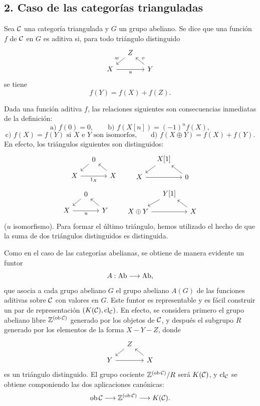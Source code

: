 \subsection*{2. Caso de las categorías trianguladas}

Sea $\mathcal C$ una categoría triangulada y $G$ un grupo abeliano. Se dice que una función $f$ de $\mathcal C$ en $G$ es aditiva si, para todo triángulo distinguido
\[
\begin{tikzcd}[column sep=small,row sep=small]
& Z \arrow[dl,"w"']\\
X \arrow[rr,"u"'] && Y \arrow[ul,"v"']
\end{tikzcd}
\]
se tiene
\[
f(Y)=f(X)+f(Z).
\]

Dada una función aditiva $f$, las relaciones siguientes son consecuencias inmediatas de la definición:
\[
\text{a) } f(0)=0,\qquad
\text{b) } f(X[n])=(-1)^n f(X),
\]
\[
\text{c) } f(X)=f(Y)\text{ si }X\text{ e }Y\text{ son isomorfos,}
\qquad
\text{d) } f(X\oplus Y)=f(X)+f(Y).
\]
En efecto, los triángulos siguientes son distinguidos:
\[
\begin{tikzcd}[column sep=small,row sep=small]
&0 \arrow[dl]\\ X \arrow[rr,"1_X"']&&X\arrow[ul]
\end{tikzcd}
\qquad
\begin{tikzcd}[column sep=small,row sep=small]
&X[1]\arrow[dl]\\ X\arrow[rr]&&0\arrow[ul]
\end{tikzcd}
\]
\[
\begin{tikzcd}[column sep=small,row sep=small]
&0\arrow[dl]\\ X\arrow[rr,"u"']&&Y\arrow[ul]
\end{tikzcd}
\qquad
\begin{tikzcd}[column sep=small,row sep=small]
&Y[1]\arrow[dl]\\ X\oplus Y\arrow[rr]&&X\arrow[ul]
\end{tikzcd}
\]
($u$ isomorfismo). Para formar el último triángulo, hemos utilizado el hecho de que la suma de dos triángulos distinguidos es distinguida.

Como en el caso de las categorías abelianas, se obtiene de manera evidente un funtor
\[
A:\operatorname{Ab}\longrightarrow\operatorname{Ab},
\]
que asocia a cada grupo abeliano $G$ el grupo abeliano $A(G)$ de las funciones aditivas sobre $\mathcal C$ con valores en $G$. Este funtor es representable y es fácil construir un par de representación $(K(\mathcal C),\operatorname{cl}_{\mathcal C})$. En efecto, se considera primero el grupo abeliano libre $\mathbb Z^{(\operatorname{ob}\mathcal C)}$ generado por los objetos de $\mathcal C$, y después el subgrupo $R$ generado por los elementos de la forma $X-Y-Z$, donde
\[
\begin{tikzcd}[column sep=small,row sep=small]
&Z\arrow[dl]\\ Y\arrow[rr]&&X\arrow[ul]
\end{tikzcd}
\]
es un triángulo distinguido. El grupo cociente $\mathbb Z^{(\operatorname{ob}\mathcal C)}/R$ será $K(\mathcal C)$, y $\operatorname{cl}_{\mathcal C}$ se obtiene componiendo las dos aplicaciones canónicas:
\[
\operatorname{ob}\mathcal C\longrightarrow \mathbb Z^{(\operatorname{ob}\mathcal C)}\longrightarrow K(\mathcal C).
\]
